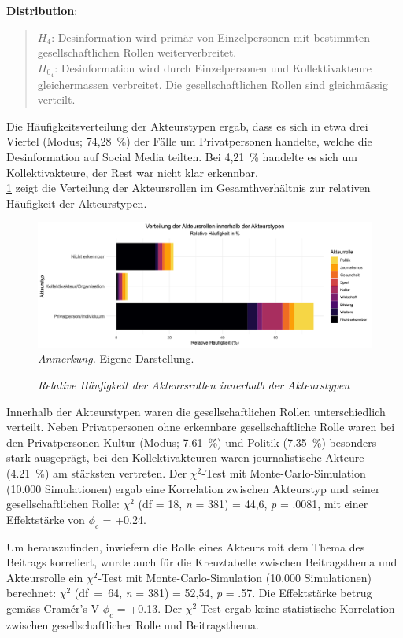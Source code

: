 \documentclass[12pt,a4paper]{article}        %
\begin{document}
\textbf{Distribution}:
\begin{quote}
  \(H_4\): Desinformation wird primär von Einzelpersonen mit bestimmten gesellschaftlichen Rollen weiterverbreitet.\\
  \(H_{0_4}\): Desinformation wird durch Einzelpersonen und Kollektivakteure gleichermassen verbreitet. Die gesellschaftlichen Rollen sind gleichmässig verteilt.
\end{quote}
Die Häufigkeitsverteilung der Akteurstypen ergab, dass es sich in etwa drei Viertel (Modus; 74,28 \%) der Fälle um Privatpersonen handelte, welche die Desinformation auf Social Media teilten. Bei 4,21 \% handelte es sich um Kollektivakteure, der Rest war nicht klar erkennbar.\\
\ref{fig:results_actor_plot} zeigt die Verteilung der Akteursrollen im Gesamthverhältnis zur relativen Häufigkeit der Akteurstypen.
\begin{figure}[H]
    \caption{\textit{Relative Häufigkeit der Akteursrollen innerhalb der Akteurstypen}}
    \label{fig:results_actor_plot}
    \centering
    \includegraphics[width=1\linewidth]{images/actor_plot.png}
\footnotesize\textit{Anmerkung.} Eigene Darstellung.
\end{figure}
Innerhalb der Akteurstypen waren die gesellschaftlichen Rollen unterschiedlich verteilt. Neben Privatpersonen ohne erkennbare gesellschaftliche Rolle waren bei den Privatpersonen Kultur (Modus; 7.61 \%) und Politik (7.35 \%) besonders stark ausgeprägt, bei den Kollektivakteuren waren journalistische Akteure (4.21 \%) am stärksten vertreten. Der \(\chi^2\)-Test mit Monte-Carlo-Simulation (10.000 Simulationen) ergab eine Korrelation zwischen Akteurstyp und seiner gesellschaftlichen Rolle: \(\chi^2\) (df = 18, \textit{n} = 381) = 44,6, \textit{p} = .0081, mit einer Effektstärke von \(\phi_c\) = +0.24.

Um herauszufinden, inwiefern die Rolle eines Akteurs mit dem Thema des Beitrags korreliert, wurde auch für die Kreuztabelle zwischen Beitragsthema und Akteursrolle ein \(\chi^2\)-Test mit Monte-Carlo-Simulation (10.000 Simulationen) berechnet:  \(\chi^2\) (df = 64, \textit{n} = 381) = 52,54, \textit{p} = .57. Die Effektstärke betrug gemäss Cramér's V \(\phi_c\) = +0.13. Der \(\chi^2\)-Test ergab keine statistische Korrelation zwischen gesellschaftlicher Rolle und Beitragsthema.
\end{document}
